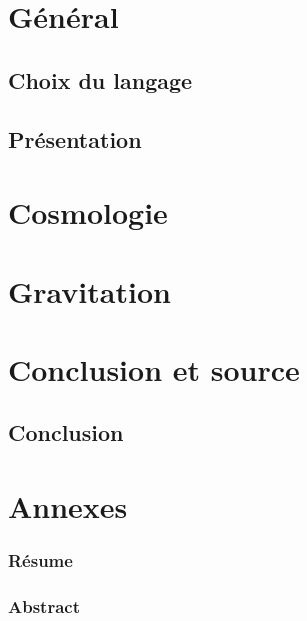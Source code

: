 \documentclass[12pt, a4paper]{report}
\begin{document}
\part{Général}
\chapter{Choix du langage}

\chapter{Présentation}

\part{Cosmologie}

\part{Gravitation}

\part{Conclusion et source}
\newpage
\chapter{Conclusion}

\listoffigures
\thispagestyle{fancy}



\part{Annexes}

\newpage

\section*{Résume}

\section*{Abstract}
\end{document}
